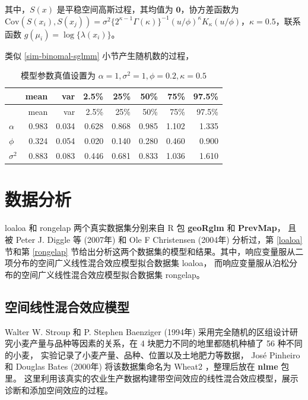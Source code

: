 \documentclass[12pt,a4paper,UTF8,twoside]{book}
\theoremstyle{definition}
\theoremstyle{definition}
\theoremstyle{definition}
\theoremstyle{remark}
\begin{document}
\noindent 其中，\(S(x)\) 是平稳空间高斯过程，其均值为
\(\mathbf{0}\)，协方差函数为
\(\mathrm{Cov}(S(x_i),S(x_j)) = \sigma^2 \big\{2^{\kappa-1}\Gamma(\kappa)\big\}^{-1}(u/\phi)^{\kappa}K_{\kappa}(u/\phi)\)，\(\kappa = 0.5\)，联系函数
\(g(\mu_i) = \log\{\lambda(x_{i})\}\)。

类似 \ref{sim-binomal-sglmm} 小节产生随机数的过程，

\begin{longtable}[]{@{}lrrrrrrr@{}}
\caption{\label{tab:Pois-MCLV-vs-NUTS} 模型参数真值设置为
\(\alpha = 1, \sigma^2 = 1, \phi = 0.2, \kappa = 0.5\)}\tabularnewline
\toprule
& mean & var & 2.5\% & 25\% & 50\% & 75\% & 97.5\%\tabularnewline
\midrule
\endfirsthead
\toprule
& mean & var & 2.5\% & 25\% & 50\% & 75\% & 97.5\%\tabularnewline
\midrule
\endhead
\(\alpha\) & 0.983 & 0.034 & 0.628 & 0.868 & 0.985 & 1.102 &
1.335\tabularnewline
\(\phi\) & 0.324 & 0.054 & 0.020 & 0.140 & 0.280 & 0.460 &
0.900\tabularnewline
\(\sigma^2\) & 0.883 & 0.083 & 0.446 & 0.681 & 0.833 & 1.036 &
1.610\tabularnewline
\bottomrule
\end{longtable}

\hypertarget{applications}{%
\chapter{数据分析}\label{applications}}

loaloa 和 rongelap 两个真实数据集分别来自 R 包 \textbf{geoRglm} 和
\textbf{PrevMap}， 且被 Peter J. Diggle 等 (2007年)
\citep{Diggle2007ATMP} 和 Ole F Christensen (2004年)
\citep{Christensen2004} 分析过，第 \ref{loaloa} 节和第 \ref{rongelap}
节给出分析这两个数据集的模型和结果。其中，响应变量服从二项分布的空间广义线性混合效应模型拟合数据集
loaloa， 而响应变量服从泊松分布的空间广义线性混合效应模型拟合数据集
rongelap。

\hypertarget{sptial-random-effects}{%
\section{空间线性混合效应模型}\label{sptial-random-effects}}

Walter W. Stroup 和 P. Stephen Baenziger (1994年) \citep{Stroup1994}
采用完全随机的区组设计研究小麦产量与品种等因素的关系，在 4
块肥力不同的地里都随机种植了 56 种不同的小麦，
实验记录了小麦产量、品种、位置以及土地肥力等数据， José Pinheiro 和
Douglas Bates (2000年) \citep{Pinheiro2000} 将该数据集命名为 Wheat2
，整理后放在 \textbf{nlme} 包里。
这里利用该真实的农业生产数据构建带空间效应的线性混合效应模型，展示诊断和添加空间效应的过程。
\end{document}
